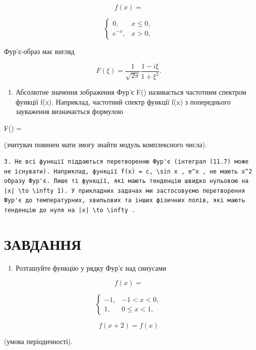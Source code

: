 \documentclass[
  ukrainian,
]{article}
\providecommand{\tightlist}{%
  \setlength{\itemsep}{0pt}\setlength{\parskip}{0pt}}
\begin{document}
\[
f(x) =
\]

\[
\begin{cases} 0, & x \le 0, \\ e^{-x}, & x > 0, \end{cases}
\]

Фур'є-образ має вигляд

\[
F(\xi) = \frac{1}{\sqrt{2\pi}} \frac{1 - i\xi}{1 + \xi^2}.
\]

\begin{enumerate}
\def\labelenumi{\arabic{enumi}.}
\setcounter{enumi}{1}
\tightlist
\item
  Абсолютне значення зображення Фур'є \textbar F(\xi)\textbar{}
  називається частотним спектром функції f(x). Наприклад, частотний
  спектр функції f(x) з попереднього зауваження визначається формулою
\end{enumerate}

\textbar F(\xi)\textbar{} = 

(зчитувач повинен мати змогу знайти модуль комплексного числа).

\begin{verbatim}
3. Не всі функції піддаються перетворенню Фур'є (інтеграл (11.7) може не існувати). Наприклад, функції f(x) = c, \sin x , e^x , не мають x^2 образу Фур'є. Лише ті функції, які мають тенденцію швидко нульовою на |x| \to \infty 1). У прикладних задачах ми застосовуємо перетворення Фур'є до температурних, хвильових та інших фізичних полів, які мають тенденцію до нуля на |x| \to \infty .
\end{verbatim}

\section{ЗАВДАННЯ}\label{ux437ux430ux432ux434ux430ux43dux43dux44f-7}

\begin{enumerate}
\def\labelenumi{\arabic{enumi}.}
\tightlist
\item
  Розташуйте функцію у рядку Фур'є над синусами
\end{enumerate}

\[
f(x) =
\]

\[
\begin{cases} -1, & -1 < x < 0, \\ 1, & 0 \le x < 1, \end{cases}
\]

\[
f(x+2) = f(x)
\]

(умова періодичності).
\end{document}
